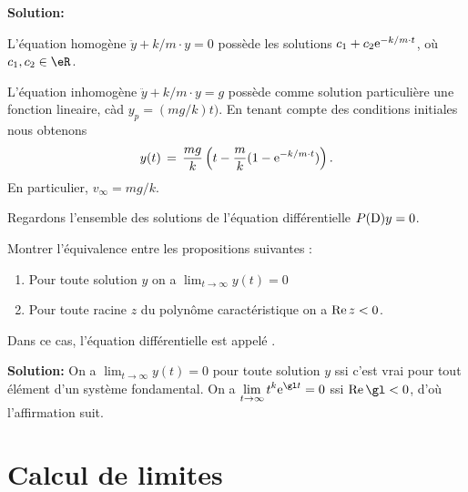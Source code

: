 \bigskip
{\bf Solution:}

\medskip
L'équation homogène $\ddot y + k/m \cdot y = 0$
possède les solutions $c_1+c_2 {\rm e}^{-k/m \cdot t}$,
où $c_1, c_2 \in \eR$.
 
L'équation inhomogène $\ddot y + k/m \cdot y = g$
possède comme solution particulière une fonction lineaire, càd 
$y_p = (mg/k)t)$.
En tenant compte des conditions initiales nous obtenons
$$
y(t) \,=\, \frac{mg}{k} \left( t-\frac mk (1-{\rm e}^{-k/m \cdot t})\right).
$$
En particulier, $v_\infty = mg/k$. 

 




\bigskip
\exerNico  
Regardons l'ensemble des solutions de l'équation différentielle $P({\rm D})y =0$.

Montrer l'équivalence entre les propositions suivantes :
\begin{enumerate}

\item
Pour toute solution $y$ on a $\displaystyle \lim_{t \to \infty} y(t) = 0$

\item
Pour toute racine $z$ du polynôme caractéristique on a ${\rm Re}\, z <0$.

\end{enumerate}
Dans ce cas, l'équation différentielle est appelé  .

\bigskip
{\bf Solution:}
On a 
$\displaystyle \lim_{t \to \infty} y(t) = 0$ pour toute solution $y$ ssi c'est vrai pour tout élément d'un système fondamental.
On a $\displaystyle \lim_{t \to \infty} t^k {\rm e}^{\gl t}=0$ ssi ${\rm Re }\,\gl <0$,
d'où l'affirmation suit.






\section{Calcul de limites}

